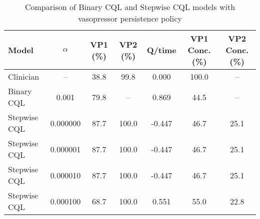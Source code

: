 \begin{table}[ht]
\centering
\caption{Comparison of Binary CQL and Stepwise CQL models with vasopressor persistence policy}
\label{tab:stepwise_comparison}
\begin{tabular}{lcccccc}
\toprule
Model & $\alpha$ & VP1 (\%) & VP2 (\%) & Q/time & VP1 Conc. (\%) & VP2 Conc. (\%) \\
\midrule
Clinician & -- & 38.8 & 99.8 & 0.000 & 100.0 & -- \\
\midrule
Binary CQL & 0.001 & 79.8 & -- & 0.869 & 44.5 & -- \\
Stepwise CQL & 0.000000 & 87.7 & 100.0 & -0.447 & 46.7 & 25.1 \\
Stepwise CQL & 0.000001 & 87.7 & 100.0 & -0.447 & 46.7 & 25.1 \\
Stepwise CQL & 0.000010 & 87.7 & 100.0 & -0.447 & 46.7 & 25.1 \\
Stepwise CQL & 0.000100 & 68.7 & 100.0 & 0.551 & 55.0 & 22.8 \\
\bottomrule
\end{tabular}
\end{table}